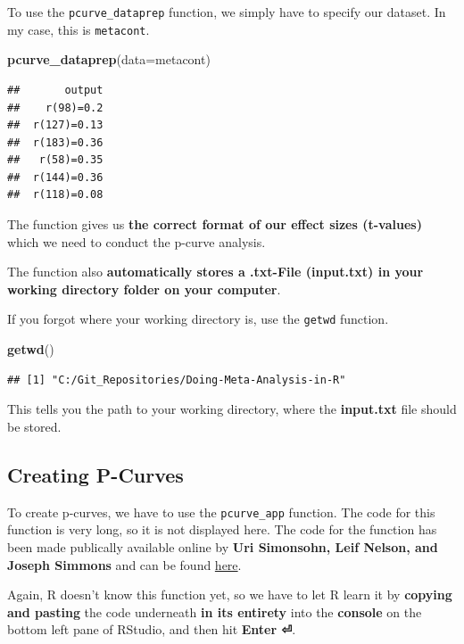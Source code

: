 \documentclass[]{book}
\newenvironment{Shaded}{\begin{snugshade}}{\end{snugshade}}
\newcommand{\DataTypeTok}[1]{\textcolor[rgb]{0.13,0.29,0.53}{#1}}
\newcommand{\KeywordTok}[1]{\textcolor[rgb]{0.13,0.29,0.53}{\textbf{#1}}}
\newcommand{\NormalTok}[1]{#1}
\begin{document}
To use the \texttt{pcurve\_dataprep} function, we simply have to specify our dataset. In my case, this is \texttt{metacont}.

\begin{Shaded}
\begin{Highlighting}[]
\KeywordTok{pcurve_dataprep}\NormalTok{(}\DataTypeTok{data=}\NormalTok{metacont)}
\end{Highlighting}
\end{Shaded}

\begin{verbatim}
##       output
##    r(98)=0.2
##  r(127)=0.13
##  r(183)=0.36
##   r(58)=0.35
##  r(144)=0.36
##  r(118)=0.08
\end{verbatim}

The function gives us \textbf{the correct format of our effect sizes (t-values)} which we need to conduct the p-curve analysis.

The function also \textbf{automatically stores a .txt-File (input.txt) in your working directory folder on your computer}.

If you forgot where your working directory is, use the \texttt{getwd} function.

\begin{Shaded}
\begin{Highlighting}[]
\KeywordTok{getwd}\NormalTok{()}
\end{Highlighting}
\end{Shaded}

\begin{verbatim}
## [1] "C:/Git_Repositories/Doing-Meta-Analysis-in-R"
\end{verbatim}

This tells you the path to your working directory, where the \textbf{input.txt} file should be stored.

\hypertarget{creating-p-curves}{%
\subsection{Creating P-Curves}\label{creating-p-curves}}

To create p-curves, we have to use the \texttt{pcurve\_app} function. The code for this function is very long, so it is not displayed here. The code for the function has been made publically available online by \textbf{Uri Simonsohn, Leif Nelson, and Joseph Simmons} and can be found \href{http://p-curve.com/app4/pcurve_app4.06.r}{here}.

Again, R doesn't know this function yet, so we have to let R learn it by \textbf{copying and pasting} the code underneath \textbf{in its entirety} into the \textbf{console} on the bottom left pane of RStudio, and then hit \textbf{Enter ⏎}.
\end{document}
